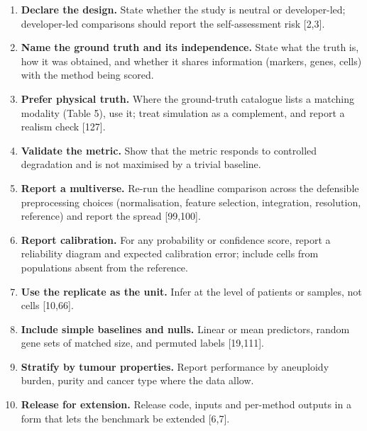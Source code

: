 \documentclass[11pt]{article}
\providecommand{\tightlist}{\setlength{\itemsep}{0pt}\setlength{\parskip}{0pt}}
\begin{document}
\begin{tcolorbox}[enhanced,breakable,colback=gray!5,colframe=gray!55,boxrule=0.6pt,arc=2pt,left=8pt,right=8pt,top=6pt,bottom=6pt,fonttitle=\bfseries,coltitle=black,colbacktitle=gray!18,title={Box 1. Minimum evaluation standard for single-cell cancer methods}]\small

\begin{enumerate}
\def\labelenumi{\arabic{enumi}.}
\tightlist
\item
  \textbf{Declare the design.} State whether the study is neutral or
  developer-led; developer-led comparisons should report the
  self-assessment risk {[}2,3{]}.
\item
  \textbf{Name the ground truth and its independence.} State what the
  truth is, how it was obtained, and whether it shares information
  (markers, genes, cells) with the method being scored.
\item
  \textbf{Prefer physical truth.} Where the ground-truth catalogue lists
  a matching modality (Table 5), use it; treat simulation as a
  complement, and report a realism check {[}127{]}.
\item
  \textbf{Validate the metric.} Show that the metric responds to
  controlled degradation and is not maximised by a trivial baseline.
\item
  \textbf{Report a multiverse.} Re-run the headline comparison across
  the defensible preprocessing choices (normalisation, feature
  selection, integration, resolution, reference) and report the spread
  {[}99,100{]}.
\item
  \textbf{Report calibration.} For any probability or confidence score,
  report a reliability diagram and expected calibration error; include
  cells from populations absent from the reference.
\item
  \textbf{Use the replicate as the unit.} Infer at the level of patients
  or samples, not cells {[}10,66{]}.
\item
  \textbf{Include simple baselines and nulls.} Linear or mean
  predictors, random gene sets of matched size, and permuted labels
  {[}19,111{]}.
\item
  \textbf{Stratify by tumour properties.} Report performance by
  aneuploidy burden, purity and cancer type where the data allow.
\item
  \textbf{Release for extension.} Release code, inputs and per-method
  outputs in a form that lets the benchmark be extended {[}6,7{]}.
\end{enumerate}
\end{tcolorbox}
\end{document}
